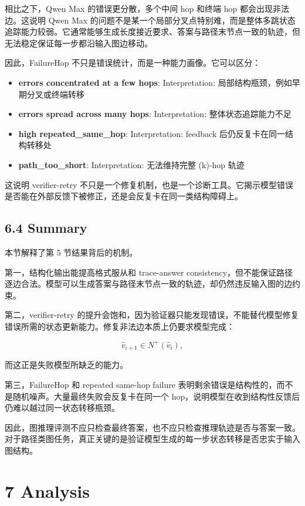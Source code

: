 \documentclass[
  11pt,
]{article}
\providecommand{\tightlist}{%
  \setlength{\itemsep}{0pt}\setlength{\parskip}{0pt}}
\begin{document}
相比之下，Qwen Max 的错误更分散，多个中间 hop 和终端 hop
都会出现非法边。这说明 Qwen Max
的问题不是某一个局部分叉点特别难，而是整体多跳状态追踪能力较弱。它通常能够生成长度接近要求、答案与路径末节点一致的轨迹，但无法稳定保证每一步都沿输入图边移动。

因此，FailureHop 不只是错误统计，而是一种能力画像。它可以区分：

\begin{itemize}
\tightlist
\item
  \textbf{errors concentrated at a few hops}: Interpretation:
  局部结构瓶颈，例如早期分叉或终端转移
\item
  \textbf{errors spread across many hops}: Interpretation:
  整体状态追踪能力不足
\item
  \textbf{high repeated\_same\_hop}: Interpretation: feedback
  后仍反复卡在同一结构转移处
\item
  \textbf{path\_too\_short}: Interpretation: 无法维持完整 (k)-hop 轨迹
\end{itemize}

这说明 verifier-retry
不只是一个修复机制，也是一个诊断工具。它揭示模型错误是否能在外部反馈下被修正，还是会反复卡在同一类结构障碍上。

\subsection{6.4 Summary}\label{summary}

本节解释了第 5 节结果背后的机制。

第一，结构化输出能提高格式服从和 trace-answer
consistency，但不能保证路径逐边合法。模型可以生成答案与路径末节点一致的轨迹，却仍然违反输入图的边约束。

第二，verifier-retry
的提升会饱和，因为验证器只能发现错误，不能替代模型修复错误所需的状态更新能力。修复非法边本质上仍要求模型完成：

\[
\hat{v}_{i+1}\in N^+(\hat{v}_i),  
\]

而这正是失败模型所缺乏的能力。

第三，FailureHop 和 repeated same-hop failure
表明剩余错误是结构性的，而不是随机噪声。大量最终失败会反复卡在同一个
hop，说明模型在收到结构性反馈后仍难以越过同一状态转移瓶颈。

因此，图推理评测不应只检查最终答案，也不应只检查推理轨迹是否与答案一致。对于路径类图任务，真正关键的是验证模型生成的每一步状态转移是否忠实于输入图结构。

\section{7 Analysis}\label{analysis-1}
\end{document}
